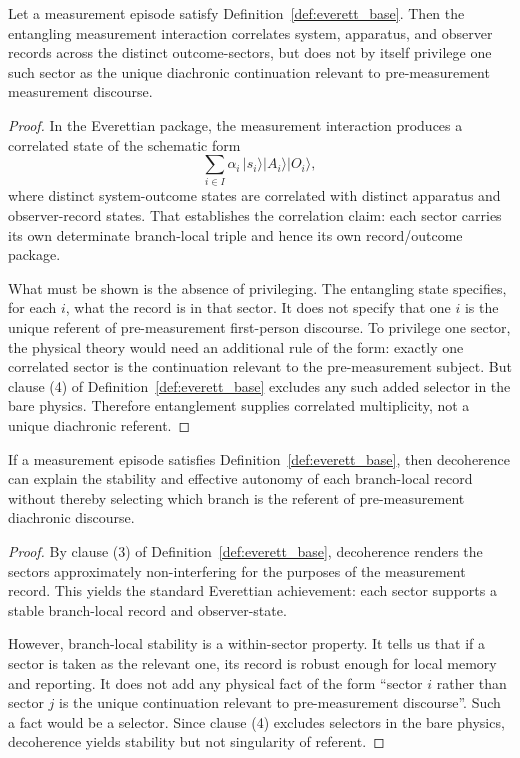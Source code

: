 \begin{lemma}
\label{lem:entangle_no_selector}
Let a measurement episode satisfy Definition~\ref{def:everett_base}. Then the entangling measurement
interaction correlates system, apparatus, and observer records across the distinct outcome-sectors,
but does not by itself privilege one such sector as the unique diachronic continuation relevant to
pre-measurement measurement discourse.
\end{lemma}

\begin{proof}
In the Everettian package, the measurement interaction produces a correlated state of the schematic
form
\[
\sum_{i\in I} \alpha_i\, \lvert s_i\rangle\lvert A_i\rangle\lvert O_i\rangle,
\]
where distinct system-outcome states are correlated with distinct apparatus and observer-record
states. That establishes the correlation claim: each sector carries its own determinate branch-local
triple and hence its own record/outcome package.

What must be shown is the absence of privileging. The entangling state specifies, for each $i$, what
the record is in that sector. It does not specify that one $i$ is the unique referent of pre-measurement
first-person discourse. To privilege one sector, the physical theory would need an additional rule of the
form: exactly one correlated sector is the continuation relevant to the pre-measurement subject. But
clause (4) of Definition~\ref{def:everett_base} excludes any such added selector in the bare physics.
Therefore entanglement supplies correlated multiplicity, not a unique diachronic referent.
\end{proof}

\begin{lemma}
\label{lem:decoherence_stability_only}
If a measurement episode satisfies Definition~\ref{def:everett_base}, then decoherence can explain the
stability and effective autonomy of each branch-local record without thereby selecting which branch is
the referent of pre-measurement diachronic discourse.
\end{lemma}

\begin{proof}
By clause (3) of Definition~\ref{def:everett_base}, decoherence renders the sectors approximately
non-interfering for the purposes of the measurement record. This yields the standard Everettian
achievement: each sector supports a stable branch-local record and observer-state.

However, branch-local stability is a within-sector property. It tells us that if a sector is taken as the
relevant one, its record is robust enough for local memory and reporting. It does not add any physical
fact of the form \enquote{sector $i$ rather than sector $j$ is the unique continuation relevant to
pre-measurement discourse}. Such a fact would be a selector. Since clause (4) excludes selectors in the
bare physics, decoherence yields stability but not singularity of referent.
\end{proof}

